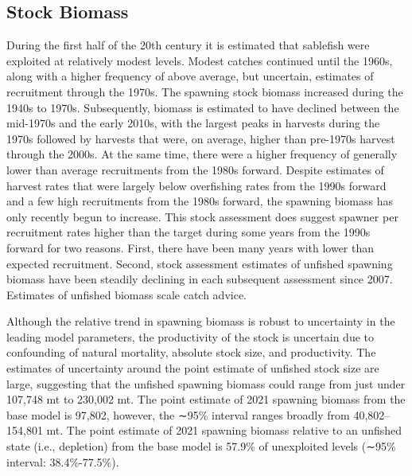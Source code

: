 \documentclass[11pt,
  english,
  a4paper,
]{article}
\begin{document}
\leavevmode\tagmcend\tagstructend\par


\hypertarget{stock-biomass}{%
\subsection*{Stock Biomass}\label{stock-biomass}}

\leavevmode\tagmcend\tagstructend


During the first half of the 20th century it is estimated that sablefish were exploited at relatively modest levels. Modest catches continued until the 1960s, along with a higher frequency of above average, but uncertain, estimates of recruitment through the 1970s. The spawning stock biomass increased during the 1940s to 1970s. Subsequently, biomass is estimated to have declined between the mid-1970s and the early 2010s, with the largest peaks in harvests during the 1970s followed by harvests that were, on average, higher than pre-1970s harvest through the 2000s. At the same time, there were a higher frequency of generally lower than average recruitments from the 1980s forward. Despite estimates of harvest rates that were largely below overfishing rates from the 1990s forward and a few high recruitments from the 1980s forward, the spawning biomass has only recently begun to increase. This stock assessment does suggest spawner per recruitment rates higher than the target during some years from the 1990s forward for two reasons. First, there have been many years with lower than expected recruitment. Second, stock assessment estimates of unfished spawning biomass have been steadily declining in each subsequent assessment since 2007. Estimates of unfished biomass scale catch advice.

\leavevmode\tagmcend\tagstructend\par


Although the relative trend in spawning biomass is robust to uncertainty in the leading model parameters, the productivity of the stock is uncertain due to confounding of natural mortality, absolute stock size, and productivity. The estimates of uncertainty around the point estimate of unfished stock size are large, suggesting that the unfished spawning biomass could range from just under 107,748 mt to 230,002 mt. The point estimate of 2021 spawning biomass from the base model is 97,802, however, the ∼95\% interval ranges broadly from 40,802--154,801 mt. The point estimate of 2021 spawning biomass relative to an unfished state (i.e., depletion) from the base model is 57.9\% of unexploited levels (∼95\% interval: 38.4\%-77.5\%).
\end{document}
